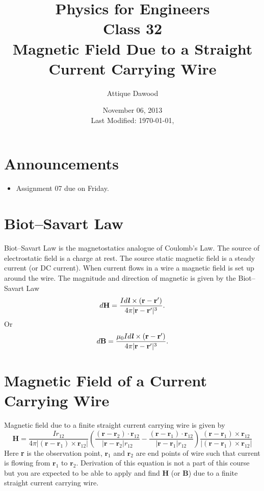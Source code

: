 \documentclass[12pt,a4paper]{article}
\title{\vspace{-3cm}Physics for Engineers\\Class 32\\Magnetic Field Due to a Straight Current Carrying Wire}
\author{Attique Dawood}
\date{November 06, 2013\\[0.2cm] Last Modified: \today, \currenttime}
\begin{document}
\maketitle
\section{Announcements}
\begin{itemize}
\item Assignment 07 due on Friday.
\end{itemize}
\section{Biot--Savart Law}
Biot--Savart Law is the magnetostatics analogue of Coulomb's Law. The source of electrostatic field is a charge at rest. The source static magnetic field is a steady current (or DC current). When current flows in a wire a magnetic field is set up around the wire. The magnitude and direction of magnetic is given by the Biot--Savart Law
\begin{equation}
d\textbf{H}=\dfrac{Id\textbf{\textit{l}}\times(\textbf{r}-\textbf{r}')}{4\pi|\textbf{r}-\textbf{r}'|^{3}}.
\end{equation}
Or
\begin{equation}
d\textbf{B}=\dfrac{\mu_0Id\textbf{\textit{l}}\times(\textbf{r}-\textbf{r}')}{4\pi|\textbf{r}-\textbf{r}'|^{3}}.
\end{equation}
\section{Magnetic Field of a Current Carrying Wire}
Magnetic field due to a finite straight current carrying wire is given by
\begin{equation}
\textbf{H}=\dfrac{Ir_{12}}{4\pi|(\textbf{r}-\textbf{r}_1)\times\textbf{r}_{12}|}\left(\dfrac{(\textbf{r}-\textbf{r}_2)\cdot\textbf{r}_{12}}{|\textbf{r}-\textbf{r}_2|r_{12}}-\dfrac{(\textbf{r}-\textbf{r}_1)\cdot\textbf{r}_{12}}{|\textbf{r}-\textbf{r}_1|r_{12}}\right)\dfrac{(\textbf{r}-\textbf{r}_1)\times\textbf{r}_{12}}{|(\textbf{r}-\textbf{r}_1)\times \textbf{r}_{12}|}
\end{equation}
Here \textbf{r} is the observation point, $\textbf{r}_1$ and $\textbf{r}_2$ are end points of wire such that current is flowing from $\textbf{r}_1$ to $\textbf{r}_2$. Derivation of this equation is not a part of this course but you are expected to be able to apply and find \textbf{H} (or \textbf{B}) due to a finite straight current carrying wire.
\newpage
\end{document}
